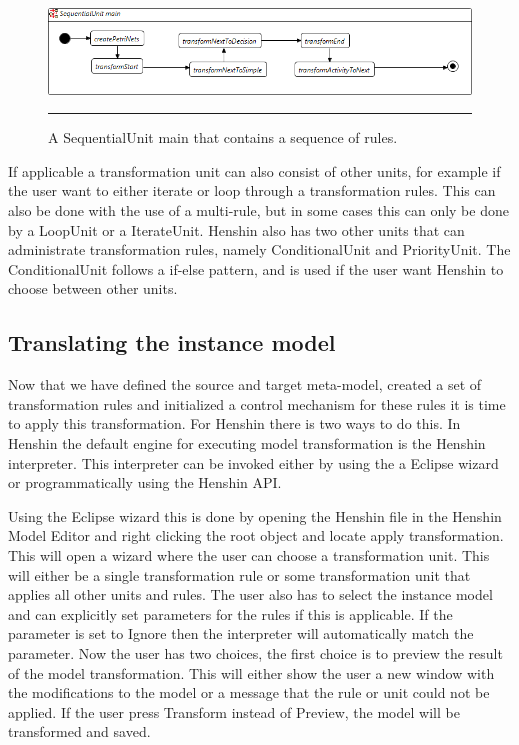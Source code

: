\begin{figure}[H]
	\centering
	\includegraphics[scale=0.5]{figures/SequentialUnitHenshin.png}
	\rule{35em}{0.5pt}
	\caption[A Sequential Unit in Henshin]
	{A SequentialUnit main that contains a sequence of rules.}
	\label{fig:SequentialUnitHenshin}
\end{figure}

If applicable a transformation unit can also consist of other units, for example
if the user want to either iterate or loop through a transformation rules. This
can also be done with the use of a multi-rule, but in some cases this can only
be done by a LoopUnit or a IterateUnit. Henshin also has two other units that
can administrate transformation rules, namely ConditionalUnit and PriorityUnit.
The ConditionalUnit follows a if-else pattern, and is used if the user want
Henshin to choose between other units. 

\subsection{Translating the instance model}

Now that we have defined the source and target meta-model, created a set of
transformation rules and initialized a control mechanism for these rules it is
time to apply this transformation. For Henshin there is two ways to do this. In
Henshin the default engine for executing model transformation is the Henshin
interpreter. This interpreter can be invoked either by using the a Eclipse wizard
or programmatically using the Henshin API. 

Using the Eclipse wizard this is done by opening the Henshin file in the Henshin
Model Editor and right clicking the root object and locate apply transformation.
This will open a wizard where the user can choose a transformation unit. This
will either be a single transformation rule or some transformation unit that
applies all other units and rules. The user also has to select the instance
model and can explicitly set parameters for the rules if this is applicable. If
the parameter is set to Ignore then the interpreter will automatically match the
parameter. Now the user has two choices, the first choice is to preview the
result of the model transformation. This will either show the user a new window
with the modifications to the model or a message that the rule or unit could not
be applied. If the user press Transform instead of Preview, the model will be
transformed and saved.

